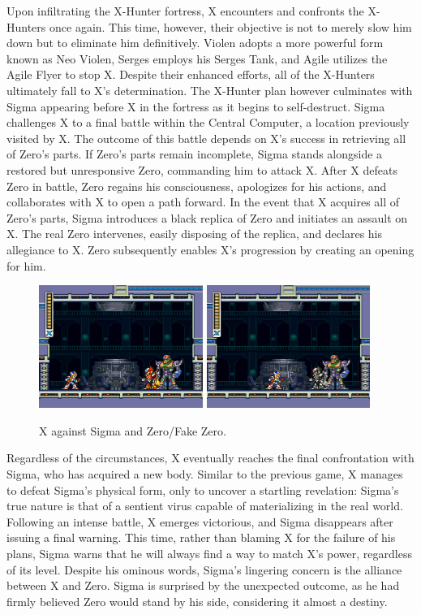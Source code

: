 Upon infiltrating the X-Hunter fortress, X encounters and confronts the X-Hunters once again. This time, however, their objective is not to merely slow him down but to eliminate him definitively. Violen adopts a more powerful form known as Neo Violen, Serges employs his Serges Tank, and Agile utilizes the Agile Flyer to stop X. Despite their enhanced efforts, all of the X-Hunters ultimately fall to X's determination. The X-Hunter plan however culminates with Sigma appearing before X in the fortress as it begins to self-destruct. Sigma challenges X to a final battle within the Central Computer, a location previously visited by X. The outcome of this battle depends on X's success in retrieving all of Zero's parts.
If Zero's parts remain incomplete, Sigma stands alongside a restored but unresponsive Zero, commanding him to attack X. After X defeats Zero in battle, Zero regains his consciousness, apologizes for his actions, and collaborates with X to open a path forward. In the event that X acquires all of Zero's parts, Sigma introduces a black replica of Zero and initiates an assault on X. The real Zero intervenes, easily disposing of the replica, and declares his allegiance to X. Zero subsequently enables X's progression by creating an opening for him.

\begin{figure}[htp]
	\centering
	\includegraphics[height=4cm]{figures/X2/story_3_2.jpg}
	\includegraphics[height=4cm]{figures/X2/story_3.jpg}
	\caption{X against Sigma and Zero/Fake Zero.}
\end{figure}

Regardless of the circumstances, X eventually reaches the final confrontation with Sigma, who has acquired a new body. Similar to the previous game, X manages to defeat Sigma's physical form, only to uncover a startling revelation: Sigma's true nature is that of a sentient virus capable of materializing in the real world. Following an intense battle, X emerges victorious, and Sigma disappears after issuing a final warning. This time, rather than blaming X for the failure of his plans, Sigma warns that he will always find a way to match X's power, regardless of its level. Despite his ominous words, Sigma's lingering concern is the alliance between X and Zero. Sigma is surprised by the unexpected outcome, as he had firmly believed Zero would stand by his side, considering it almost a destiny.

